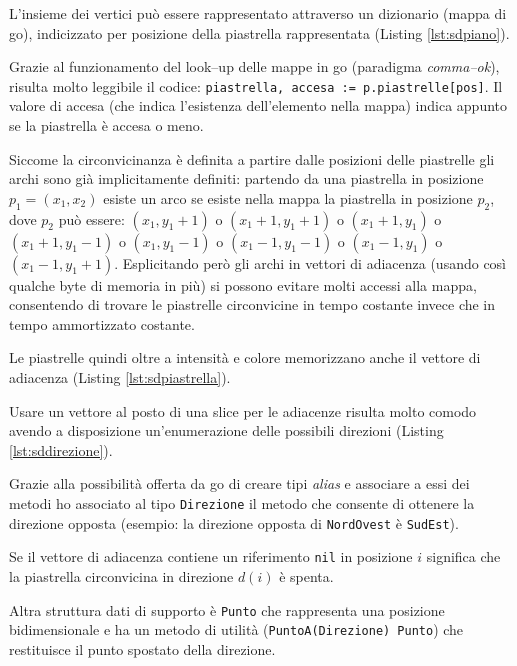 \documentclass[a4paper,12pt]{article}
\begin{document}
	L'insieme dei vertici può essere rappresentato attraverso un dizionario (mappa di go), indicizzato per posizione della piastrella rappresentata (Listing \ref{lst:sdpiano}).
	
	Grazie al funzionamento del look--up delle mappe in go (paradigma \emph{comma--ok}), risulta molto leggibile il codice: \texttt{piastrella, accesa := p.piastrelle[pos]}.
	Il valore di accesa (che indica l'esistenza dell'elemento nella mappa) indica appunto se la piastrella è accesa o meno.
	
	Siccome la circonvicinanza è definita a partire dalle posizioni delle piastrelle gli archi sono già implicitamente definiti: partendo da una piastrella in posizione \(p_1 = (x_1, x_2)\) esiste un arco se esiste nella mappa la piastrella in posizione \(p_2\), dove \(p_2\) può essere: 
	\((x_1, y_1+1)\) o 
	\((x_1+1, y_1+1)\) o 
	\((x_1+1, y_1)\) o 
	\((x_1+1, y_1-1)\) o 
	\((x_1, y_1-1)\) o 
	\((x_1-1, y_1-1)\) o 
	\((x_1-1, y_1)\) o 
	\((x_1-1, y_1+1)\).
	Esplicitando però gli archi in vettori di adiacenza (usando così qualche byte di memoria in più) si possono evitare molti accessi alla mappa, consentendo di trovare le piastrelle circonvicine in tempo costante invece che in tempo ammortizzato costante.
	
	Le piastrelle quindi oltre a intensità e colore memorizzano anche il vettore di adiacenza (Listing \ref{lst:sdpiastrella}).
	
	
	Usare un vettore al posto di una slice per le adiacenze risulta molto comodo avendo a disposizione un'enumerazione delle possibili direzioni (Listing \ref{lst:sddirezione}).
	
	
	Grazie alla possibilità offerta da go di creare tipi \emph{alias} e associare a essi dei metodi ho associato al tipo \texttt{Direzione} il metodo che consente di ottenere la direzione opposta (esempio: la direzione opposta di \texttt{NordOvest} è \texttt{SudEst}).
	
	Se il vettore di adiacenza contiene un riferimento \texttt{nil} in posizione \(i\) significa che la piastrella circonvicina in direzione \(d(i)\) è spenta.
	
	Altra struttura dati di supporto è \texttt{Punto} che rappresenta una posizione bidimensionale e ha un metodo di utilità (\texttt{PuntoA(Direzione) Punto}) che restituisce il punto spostato della direzione.
\end{document}
